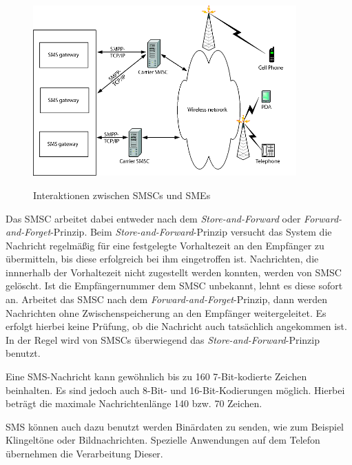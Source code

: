 \documentclass[german,12pt,a4paper]{article}
\begin{document}
\begin{figure}[htm]
    \centering
	\includegraphics[width=0.9\textwidth]{img/smspp.png}
    \label{fig:smspp}
    \caption{Interaktionen zwischen SMSCs und SMEs}
\end{figure}	

Das SMSC arbeitet dabei entweder nach dem \textit{Store-and-Forward} oder 
\textit{Forward-and-Forget}-Prinzip. Beim \textit{Store-and-Forward}-Prinzip versucht das System 
die Nachricht regelmäßig für eine festgelegte Vorhaltezeit an den Empfänger 
zu übermitteln, bis diese erfolgreich bei ihm eingetroffen ist\cite{held:down}. Nachrichten, die innnerhalb 
der Vorhaltezeit nicht zugestellt werden konnten, werden von SMSC gelöscht. 
Ist die Empfängernummer dem SMSC unbekannt, lehnt es diese sofort an.
Arbeitet das SMSC nach dem \textit{Forward-and-Forget}-Prinzip, dann werden Nachrichten ohne 
Zwischenspeicherung an den Empfänger weitergeleitet. Es erfolgt hierbei keine Prüfung, 
ob die Nachricht auch tatsächlich angekommen ist. In der Regel wird von SMSCs überwiegend 
das \textit{Store-and-Forward}-Prinzip benutzt.

Eine SMS-Nachricht kann gewöhnlich bis zu 160 7-Bit-kodierte Zeichen beinhalten. 
Es sind jedoch auch 8-Bit- und 16-Bit-Kodierungen möglich. Hierbei beträgt die 
maximale Nachrichtenlänge 140 bzw. 70 Zeichen\cite{thesms}. 

SMS können auch dazu benutzt werden Binärdaten zu senden, wie zum Beispiel 
Klingeltöne oder Bildnachrichten. Spezielle Anwendungen auf 
dem Telefon übernehmen die Verarbeitung Dieser.
\end{document}
